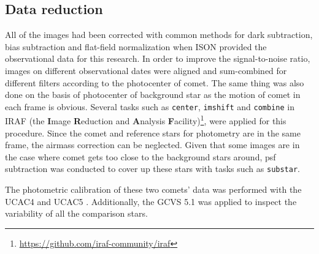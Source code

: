 \subsection{Data reduction}

All of the images had been corrected with common methods for dark subtraction, bias subtraction and flat-field normalization when ISON provided the observational data for this research. In order to improve the signal-to-noise ratio, images on different observational dates were aligned and sum-combined for different filters according to the photocenter of comet. The same thing was also done on the basis of photocenter of background star as the motion of comet in each frame is obvious. Several tasks such as \texttt{center}, \texttt{imshift} and \texttt{combine} in IRAF (the \textbf{I}mage \textbf{R}eduction and \textbf{A}nalysis \textbf{F}acility)\footnote{\url{https://github.com/iraf-community/iraf}}, were applied for this procedure. Since the comet and reference stars for photometry are in the same frame, the airmass correction can be neglected. Given that some images are in the case where comet gets too close to the background stars around, psf subtraction was conducted to cover up these stars with tasks such as \verb|substar|. 

The photometric calibration of these two comets' data was performed with the UCAC4 \citep{zacharias_fourth_2013} and UCAC5 \citep{zacharias_ucac5_2017}. Additionally, the GCVS 5.1 \citep{samus_general_2017} was applied to inspect the variability of all the comparison stars. 

